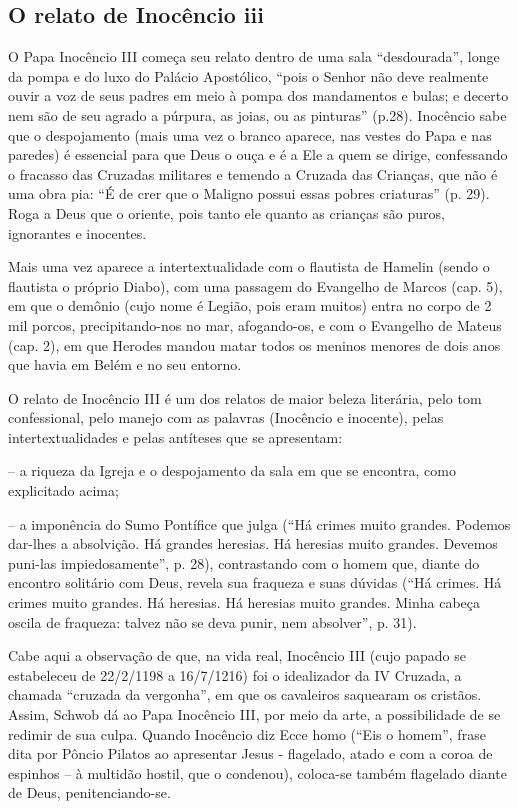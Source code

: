 \documentclass[12pt]{extarticle}
\begin{document}
\subsection{O relato de Inocêncio iii}

O Papa Inocêncio III começa seu relato dentro de uma sala
``desdourada'', longe da pompa e do luxo do Palácio Apostólico, ``pois o
Senhor não deve realmente ouvir a voz de seus padres em meio à pompa dos
mandamentos e bulas; e decerto nem são de seu agrado a púrpura, as
joias, ou as pinturas'' (p.28). Inocêncio sabe que o despojamento (mais
uma vez o branco aparece, nas vestes do Papa e nas paredes) é essencial
para que Deus o ouça e é a Ele a quem se dirige, confessando o fracasso
das Cruzadas militares e temendo a Cruzada das Crianças, que não é uma
obra pia: ``É de crer que o Maligno possui essas pobres criaturas'' (p.
29). Roga a Deus que o oriente, pois tanto ele quanto as crianças são
puros, ignorantes e inocentes.




Mais uma vez aparece a intertextualidade com o flautista de Hamelin
(sendo o flautista o próprio Diabo), com uma passagem do Evangelho de
Marcos (cap. 5), em que o demônio (cujo nome é Legião, pois eram muitos)
entra no corpo de 2 mil porcos, precipitando-nos no mar, afogando-os, e
com o Evangelho de Mateus (cap. 2), em que Herodes mandou matar todos os
meninos menores de dois anos que havia em Belém e no seu entorno.

O relato de Inocêncio III é um dos relatos de maior beleza literária,
pelo tom confessional, pelo manejo com as palavras (Inocêncio e
inocente), pelas intertextualidades e pelas antíteses que se
apresentam:

-- a riqueza da Igreja e o despojamento da sala em que se encontra, como
explicitado acima;

-- a imponência do Sumo Pontífice que julga (``Há crimes muito grandes.
Podemos dar-lhes a absolvição. Há grandes heresias. Há heresias muito
grandes. Devemos puni-las impiedosamente'', p. 28), contrastando com o
homem que, diante do encontro solitário com Deus, revela sua fraqueza e
suas dúvidas (``Há crimes. Há crimes muito grandes. Há heresias. Há
heresias muito grandes. Minha cabeça oscila de fraqueza: talvez não se
deva punir, nem absolver'', p. 31).

Cabe aqui a observação de que, na vida real, Inocêncio III (cujo papado
se estabeleceu de 22/2/1198 a 16/7/1216) foi o idealizador da IV
Cruzada, a chamada ``cruzada da vergonha'', em que os cavaleiros
saquearam os cristãos. Assim, Schwob dá ao Papa Inocêncio III, por meio
da arte, a possibilidade de se redimir de sua culpa. Quando Inocêncio
diz Ecce homo (``Eis o homem'', frase dita por Pôncio Pilatos ao
apresentar Jesus - flagelado, atado e com a coroa de espinhos -- à
multidão hostil, que o condenou), coloca-se também flagelado diante de
Deus, penitenciando-se.
\end{document}
